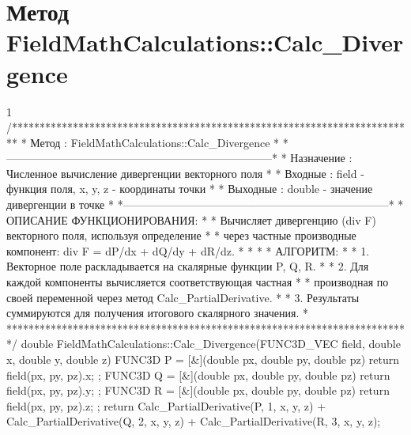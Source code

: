 \section{Метод FieldMathCalculations::Calc\_Divergence}
\footnotesize
\begin{listing}{1}
/*************************************************************************
* Метод         : FieldMathCalculations::Calc_Divergence                 *
*------------------------------------------------------------------------*
* Назначение    : Численное вычисление дивергенции векторного поля       *
* Входные       : field - функция поля, x, y, z - координаты точки       *
* Выходные      : double - значение дивергенции в точке                  *
*------------------------------------------------------------------------*
* ОПИСАНИЕ ФУНКЦИОНИРОВАНИЯ:                                             *
* Вычисляет дивергенцию (div F) векторного поля, используя определение   *
* через частные производные компонент: div F = dP/dx + dQ/dy + dR/dz.     *
* *
* АЛГОРИТМ:                                                              *
* 1. Векторное поле раскладывается на скалярные функции P, Q, R.         *
* 2. Для каждой компоненты вычисляется соответствующая частная           *
* производная по своей переменной через метод Calc_PartialDerivative.    *
* 3. Результаты суммируются для получения итогового скалярного значения. *
*************************************************************************/
double FieldMathCalculations::Calc_Divergence(FUNC3D_VEC field, double x, 
                                              double y, double z) {
    FUNC3D P = [&](double px, double py, double pz) { 
        return field(px, py, pz).x; };
    FUNC3D Q = [&](double px, double py, double pz) { 
        return field(px, py, pz).y; };
    FUNC3D R = [&](double px, double py, double pz) { 
        return field(px, py, pz).z; };
    return Calc_PartialDerivative(P, 1, x, y, z) + 
           Calc_PartialDerivative(Q, 2, x, y, z) + 
           Calc_PartialDerivative(R, 3, x, y, z);
}
\end{listing}
\normalsize

\pagebreak


